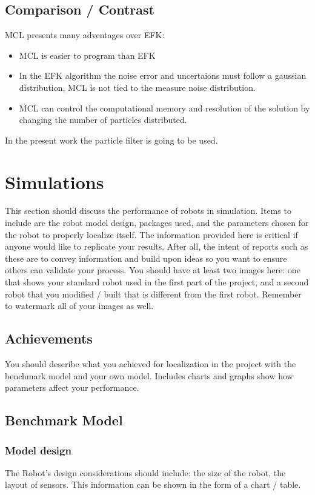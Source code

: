 \documentclass[10pt,journal,compsoc]{IEEEtran}
\begin{document}
\subsection{Comparison / Contrast}

MCL presents many adventages over EFK:

\begin{itemize}
\item MCL is easier to program than EFK 
\item In the EFK algorithm the noise error and uncertaions must follow a gaussian distribution, MCL is not tied to the measure noise distribution.
\item MCL can control the computational memory and resolution of the solution by changing the number of particles distributed.
\end{itemize} 

In the present work the particle filter is going to be used.


\section{Simulations}
This section should discuss the performance of robots in simulation. Items to include are the robot model design, packages used, and the parameters chosen for the robot to properly localize itself. The information provided here is critical if anyone would like to replicate your results. After all, the intent of reports such as these are to convey information and build upon ideas so you want to ensure others can validate your process.
You should have at least two images here: one that shows your standard robot used in the first part of the project, and a second robot that you modified / built that is different from the first robot. Remember to watermark all of your images as well. 

\subsection{Achievements}
You should describe what you achieved for localization in the project with the benchmark model and your own model. Includes charts and graphs show how parameters affect your performance. 

\subsection{Benchmark Model}


\subsubsection{Model design}
The Robot's design considerations should include: the size of the robot, the layout of sensors. This information can be shown in the form of a chart / table.
\end{document}
